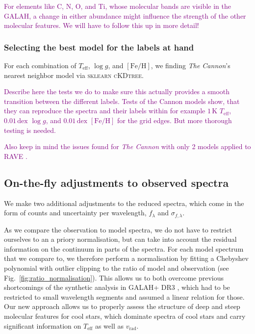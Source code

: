 \documentclass[
  journal=pasa,
  manuscript=research-paper, %
  year=2021,
  volume=37,
]{cup-journal}
\newcommand{\SB}[1]{{\textcolor{purple}{#1}}}
\newcommand{\Teff}{$T_\mathrm{eff}$\xspace}
\newcommand{\logg}{$\log g$\xspace}
\newcommand{\feh}{$\mathrm{[Fe/H]}$\xspace}
\newcommand{\vrad}{$v_\mathrm{rad}$\xspace}
\newcommand{\TheCannon}{\textit{The Cannon}\xspace}
\newcommand{\TLF}{\Teff, \logg, and \feh}
\newcommand{\dex}{\,\mathrm{dex}}	%
\newcommand{\K}{\,\mathrm{K}}	%
\begin{document}
\SB{For elements like C, N, O, and Ti, whose molecular bands are visible in the GALAH, a change in either abundance might influence the strength of the other molecular features. We will have to follow this up in more detail!}

\subsubsection{Selecting the best model for the labels at hand}

For each combination of \TLF, we finding \TheCannon's nearest neighbor model via \textsc{sklearn} \textsc{cKDtree}.

\SB{Describe here the tests we do to make sure this actually provides a smooth transition between the different labels. Tests of the Cannon models show, that they can reproduce the spectra and their labels within for example $1\K$ \Teff, $0.01\dex$ \logg, and $0.01\dex$ \feh for the grid edges. But more thorough testing is needed.}

\SB{Also keep in mind the issues found for \TheCannon with only 2 models applied to RAVE \citep{Casey2017}.}

\subsection{On-the-fly adjustments to observed spectra} \label{subsec:adjustments_observation}

We make two additional adjustments to the reduced spectra, which come in the form of counts and uncertainty per wavelength, $f_\lambda$ and $\sigma_{f,\lambda}$.

As we compare the observation to model spectra, we do not have to restrict ourselves to an a priory normalisation, but can take into account the residual information on the continuum in parts of the spectra. For each model spectrum that we compare to, we therefore perform a normalisation by fitting a Chebyshev polynomial with outlier clipping to the ratio of model and observation (see Fig.~\ref{fig:ratio_normalisation}). This allows us to both overcome previous shortcomings of the synthetic analysis in GALAH+ DR3 \citep{Buder2021}, which had to be restricted to small wavelength segments and assumed a linear relation for those. Our new approach allows us to properly assess the structure of deep and steep molecular features for cool stars, which dominate spectra of cool stars and carry significant information on \Teff as well as \vrad.
\end{document}
